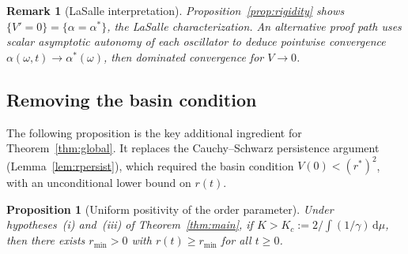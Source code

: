 \documentclass[11pt,a4paper]{article}
\newtheorem{proposition}[theorem]{Proposition}
\newtheorem{remark}[theorem]{Remark}
\theoremstyle{definition}
\begin{document}
\begin{remark}[LaSalle interpretation]
Proposition~\ref{prop:rigidity} shows $\{V'=0\}=\{\alpha=\alpha^*\}$, the LaSalle characterization. An alternative proof path uses scalar asymptotic autonomy of each oscillator to deduce pointwise convergence $\alpha(\omega,t)\to\alpha^*(\omega)$, then dominated convergence for $V\to 0$.
\end{remark}

\subsection{Removing the basin condition}\label{sec:bootstrap}

The following proposition is the key additional ingredient for Theorem~\ref{thm:global}. It replaces the Cauchy--Schwarz persistence argument (Lemma~\ref{lem:rpersist}), which required the basin condition $V(0)<(r^*)^2$, with an unconditional lower bound on $r(t)$.

\begin{proposition}[Uniform positivity of the order parameter]\label{prop:rpos}
Under hypotheses~(i) and~(iii) of Theorem~\ref{thm:main}, if $K>K_c:=2/\!\int\!(1/\gamma)\,\mathrm{d}\mu$, then there exists $r_{\min}>0$ with $r(t)\geq r_{\min}$ for all $t\geq 0$.
\end{proposition}
\end{document}
